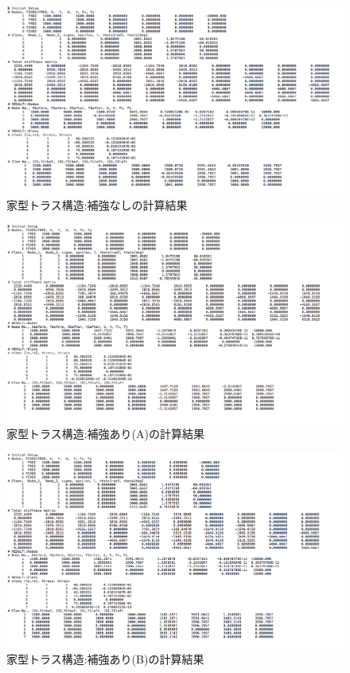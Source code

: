 \documentclass[a4paper,11pt,uplatex]{jsarticle}
\begin{document}
\begin{figure}[H]
  \begin{center}
    \includegraphics[width = 14cm]{画像/squareresult.png}
    \caption{家型トラス構造:補強なしの計算結果}
    \label{補強なし結果}
  \end{center}
\end{figure}

\begin{figure}[H]
  \begin{center}
    \includegraphics[width = 14cm]{画像/square25result.png}
    \caption{家型トラス構造:補強あり(A)の計算結果}
    \label{補強A結果}
  \end{center}
\end{figure}

\begin{figure}[H]
  \begin{center}
    \includegraphics[width = 14cm]{画像/square34result.png}
    \caption{家型トラス構造:補強あり(B)の計算結果}
    \label{補強結果B}
  \end{center}
\end{figure}
\end{document}
